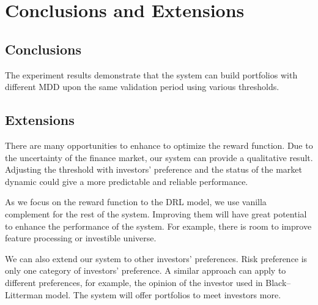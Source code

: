 \chapter{Conclusions and Extensions}
\label{c:conclusion}
\section{Conclusions}
The experiment results demonstrate that the system can build portfolios with different MDD upon the same validation period using various thresholds. 


\section{Extensions}

There are many opportunities to enhance to optimize the reward function. Due to the uncertainty of the finance market, our system can provide a qualitative result. Adjusting the threshold with investors' preference and the status of the market dynamic could give a more predictable and reliable performance.

As we focus on the reward function to the DRL model, we use vanilla complement for the rest of the system. Improving them will have great potential to enhance the performance of the system. For example, there is room to improve feature processing or investible universe.

\par
We can also extend our system to other investors' preferences. Risk preference is only one category of investors' preference. A similar approach can apply to different preferences, for example, the opinion of the investor used in Black–Litterman model\cite{black1992global}. The system will offer portfolios to meet investors more.  